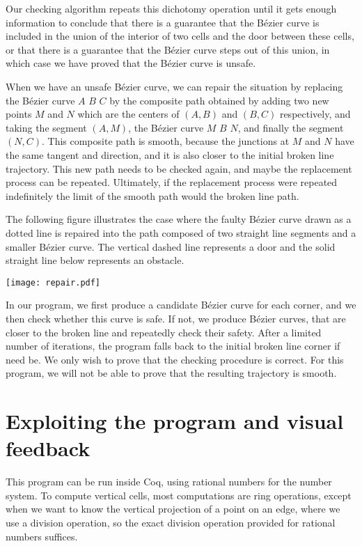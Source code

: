 \documentclass{easychair}
\begin{document}
Our checking
algorithm repeats this dichotomy operation until it gets enough
information to conclude that there is a guarantee that the Bézier curve
is included in the union of the interior of two cells and the door
between these cells, or that there is a guarantee that the Bézier curve
steps out of this union, in which case we have proved that the Bézier
curve is unsafe.

When we have an unsafe Bézier curve, we can repair the situation by
replacing the Bézier curve \(A\) \(B\) \(C\) by the composite path
obtained by adding two new points \(M\) and \(N\) which are the
centers of \((A,B)\) and \((B,C)\) respectively, and taking the
segment \((A,M)\), the Bézier curve \(M\) \(B\) \(N\), and finally the
segment \((N, C)\).  This composite path is smooth, because the
junctions at \(M\) and \(N\) have the same tangent and direction, and
it is also closer to the initial broken line trajectory.  
This new path needs to be checked again,
and maybe the replacement process can be repeated.  Ultimately,
if the replacement process were repeated indefinitely the limit of the
smooth path would the broken line path.

The following figure illustrates the case where the faulty Bézier
curve drawn as a dotted line is repaired into the path composed of two
straight line segments and a smaller Bézier curve.  The vertical
dashed line represents a door and the solid straight line below
represents an obstacle.

\begin{center}
\texttt{[image: repair.pdf]}
\end{center}

In our program, we first produce a candidate Bézier curve for each
corner, and we then check whether this curve is safe.  If not, we
produce Bézier curves, that are closer to the broken line and
repeatedly check their safety.  After a limited number of iterations,
the program falls back to the initial broken line corner if need be.
We only wish to prove that the checking procedure is correct.  For
this program, we will not be able to prove that the resulting trajectory
is smooth.

\section{Exploiting the program and visual feedback}
This program can be run inside Coq, using rational numbers for the
number system.  To compute vertical cells, most computations are ring
operations, except when we want to know the vertical projection of a
point on an edge, where we use a division operation, so the exact
division operation provided for rational numbers suffices.
\end{document}
